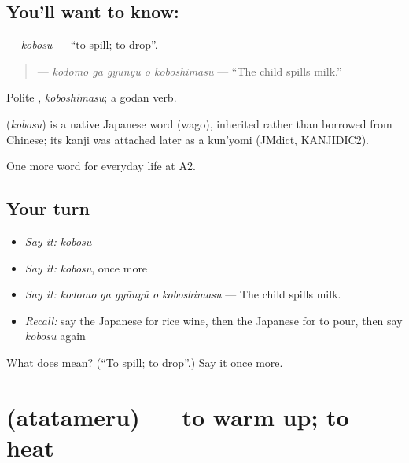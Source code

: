 \subsection*{You'll want to know: }
\textbf{} — \emph{kobosu} — \textquotedblleft{}to spill; to drop\textquotedblright{}.

\begin{quote}
\textbf{  } — \emph{kodomo ga gyūnyū o koboshimasu} — \textquotedblleft{}The child spills milk.\textquotedblright{}
\end{quote}

Polite \textbf{}, \emph{koboshimasu}; a godan verb.

\begin{cousinweb}
\textbf{} (\emph{kobosu}) is a native Japanese word (wago), inherited rather than borrowed from Chinese; its kanji was attached later as a kun'yomi (JMdict, KANJIDIC2).
\end{cousinweb}

\begin{grammarlens}[title={What you've built}]
One more word for everyday life at A2.
\end{grammarlens}

\subsection*{Your turn}
\begin{itemize}
\raggedright
  \item \emph{Say it:} \emph{kobosu}
  \item \emph{Say it:} \emph{kobosu}, once more
  \item \emph{Say it:} \emph{kodomo ga gyūnyū o koboshimasu} — The child spills milk.
  \item \emph{Recall:} say the Japanese for rice wine, then the Japanese for to pour, then say \emph{kobosu} again
\end{itemize}

\begin{tcolorbox}[breakable,colback=teal!4,colframe=teal!35!black,title={Before you move on}]
What does  mean? (\textquotedblleft{}To spill; to drop\textquotedblright{}.) Say it once more.
\end{tcolorbox}
\section[\texorpdfstring{\ja{あたためる} (atatameru)}{あたためる (atatameru)}]{ (atatameru) — to warm up; to heat}


